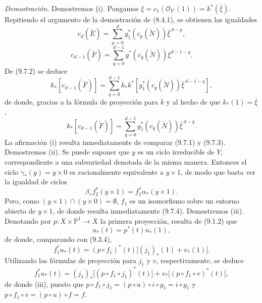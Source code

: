\emph{Demostración.} Demostremos (i). Pongamos $\xi=c_1(\mathcal O_{Y'}(1))=k^*(\bar\xi)$. Repitiendo el argumento de la demostración de (8.4.1), se obtienen las igualdades
\[
c_d(\check E)=\sum_{p=0}^d g_1^*(c_p(\check N))\bar\xi^{\,d-p},
\tag{9.7.1}
\]
\[
c_{d-1}(\check F)=\sum_{q=0}^{d-1}g^*(c_q(\check N))\xi^{d-1-q}.
\tag{9.7.2}
\]
De (9.7.2) se deduce
\[
k_*[c_{d-1}(\check F)]
=\sum_{q=0}^{d-1}k_*k^*[g_1^*(c_q(\check N))\bar\xi^{\,d-1-q}],
\]
de donde, gracias a la fórmula de proyección para $k$ y al hecho de que $k_*(1)=\bar\xi$,
\[
k_*[c_{d-1}(\check F)]=\sum_{q=0}^{d-1}g_1^*(c_q(\check N))\bar\xi^{\,d-q}.
\tag{9.7.3}
\]
La afirmación (i) resulta inmediatamente de comparar (9.7.1) y (9.7.3). Demostremos (ii). Se puede suponer que $y$ es un ciclo irreducible de $Y$, correspondiente a una subvariedad denotada de la misma manera. Entonces el ciclo $\gamma_*(y)=y\times0$ es racionalmente equivalente a $y\times1$, de modo que basta ver la igualdad de ciclos
\[
\beta_*f_2^*(y\times1)=f_1^*\alpha_*(y\times1).
\tag{9.7.4}
\]
Pero, como $(y\times1)\cap(y\times0)=\emptyset$, $f_1$ es un isomorfismo sobre un entorno abierto de $y\times1$, de donde resulta inmediatamente (9.7.4). Demostremos (iii). Denotando por $p:X\times\mathbb P^1\to X$ la primera proyección, resulta de (9.1.2) que
\[
u_*(t)=p^*(t)u_*(1),
\tag{9.7.5}
\]
de donde, comparando con (9.3.4),
\[
f_1^*u_*(t)=(p\circ f_1)^*(t)\bigl[(j_1)_*(1)+v_*(1)\bigr].
\tag{9.7.6}
\]
Utilizando las fórmulas de proyección para $j_1$ y $v$, respectivamente, se deduce
\[
f_1^*u_*(t)=(j_1)_*\bigl[(p\circ f_1\circ j_1)^*(t)\bigr]+v_*\bigl[(p\circ f_1\circ v)^*(t)\bigr],
\tag{9.7.7}
\]
de donde (iii), puesto que $p\circ f_1\circ j_1=(p\circ u)\circ i\circ g_1=i\circ g_1$ y $p\circ f_1\circ v=(p\circ u)\circ f=f$.

